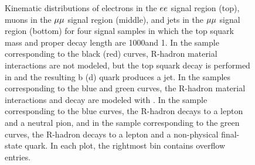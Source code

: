\begin{figure}
\caption{
Kinematic distributions of electrons in the $ee$ signal region (top), muons in the ${\mu}{\mu}$ signal region (middle), and jets in the ${\mu}{\mu}$ signal region (bottom) for four signal samples in which the top squark mass and proper decay length are 1000\GeV and 1\cm. In the sample corresponding to the black (red) curves, R-hadron material interactions are not modeled, but the top squark decay is performed in \PYTHIA and the resulting b (d) quark produces a jet. In the samples corresponding to the blue and green curves, the R-hadron material interactions and decay are modeled with \GEANTfour. In the sample corresponding to the blue curves, the R-hadron decays to a lepton and a neutral pion, and in the sample corresponding to the green curves, the R-hadron decays to a lepton and a non-physical final-state quark.  In each plot, the rightmost bin contains overflow entries.
}
\label{r_hadrons_sr}
\end{figure}